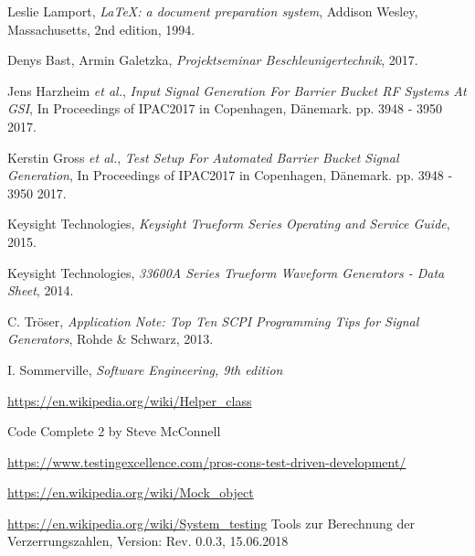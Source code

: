 \documentclass[../Report.tex]{subfiles}
\begin{document}


\begin{thebibliography}{9}

  Leslie Lamport,
  \textit{\LaTeX: a document preparation system},
  Addison Wesley, Massachusetts,
  2nd edition,
  1994.
  
	Denys Bast, Armin Galetzka, 
	\textit{Projektseminar Beschleunigertechnik},
	2017.
 
	Jens Harzheim \textit{et al.}, 
	\textit{Input Signal Generation For Barrier Bucket RF Systems At GSI}, In Proceedings of IPAC2017 in Copenhagen, Dänemark. 
	pp. 3948 - 3950
	2017.
	
	Kerstin Gross \textit{et al.},
	\textit{Test Setup For Automated Barrier Bucket Signal Generation},
	In Proceedings of IPAC2017 in Copenhagen, Dänemark. 
	pp. 3948 - 3950
	2017.
	
	Keysight Technologies,
	\textit{Keysight Trueform Series Operating and Service Guide},
	2015.

	Keysight Technologies,
	\textit{33600A Series Trueform Waveform Generators - Data Sheet},
	2014.
	
	C. Tröser, 
	\textit{Application Note: Top Ten SCPI Programming Tips for Signal Generators},
	Rohde \& Schwarz,
	2013.
	
	I. Sommerville,
	\textit{Software Engineering, 9th edition}
	
	\url{https://en.wikipedia.org/wiki/Helper_class}
	
	Code Complete 2 by Steve McConnell
	
	\url{https://www.testingexcellence.com/pros-cons-test-driven-development/}
	
	\url{https://en.wikipedia.org/wiki/Mock_object}
	
	\url{https://en.wikipedia.org/wiki/System_testing}	
	Tools zur Berechnung der Verzerrungszahlen, Version: Rev. 0.0.3, 15.06.2018
\end{thebibliography}
\end{document}
